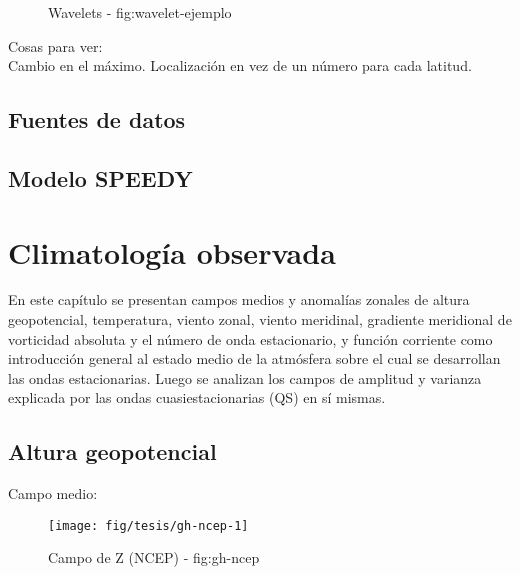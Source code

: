 \documentclass[spanish,a4paper]{book}
\begin{document}
\begin{figure*}
\caption{Wavelets - fig:wavelet-ejemplo}\label{fig:wavelet-ejemplo}
\end{figure*}

Cosas para ver:\\
Cambio en el máximo. Localización en vez de un número para cada latitud.

\section{Fuentes de datos}\label{fuentes-de-datos}

\section{Modelo SPEEDY}\label{modelo-speedy}

\chapter{Climatología observada}\label{climatologia-observada}

En este capítulo se presentan campos medios y anomalías zonales de
altura geopotencial, temperatura, viento zonal, viento meridinal,
gradiente meridional de vorticidad absoluta y el número de onda
estacionario, y función corriente como introducción general al estado
medio de la atmósfera sobre el cual se desarrollan las ondas
estacionarias. Luego se analizan los campos de amplitud y varianza
explicada por las ondas cuasiestacionarias (QS) en sí mismas.

\section{Altura geopotencial}\label{altura-geopotencial}

Campo medio:

\begin{landscape}\begin{figure}

{\centering \texttt{[image: fig/tesis/gh-ncep-1]} 

}

\caption{Campo de Z (NCEP) - fig:gh-ncep}\label{fig:gh-ncep}
\end{figure}
\end{landscape}
\end{document}
